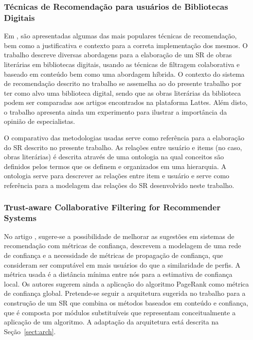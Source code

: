 \documentclass[12pt]{article}
\begin{document}
\subsubsection{Técnicas de Recomendação para usuários de Bibliotecas
Digitais}

Em \cite{primo2006tecnicas}, são apresentadas algumas das mais populares técnicas de recomendação, bem como a justificativa e contexto para a 
correta implementação dos mesmos. O trabalho descreve diversas abordagens para a elaboração de um SR de obras literárias 
em bibliotecas digitais, usando as técnicas de filtragem colaborativa e baseado em conteúdo bem como uma abordagem híbrida. 
O contexto do sistema de recomendação descrito no trabalho se assemelha ao do presente trabalho por ter como alvo uma 
biblioteca digital, sendo que as obras literárias da biblioteca podem ser comparadas aos artigos encontrados na plataforma 
Lattes. Além disto, o trabalho apresenta ainda um experimento para ilustrar a importância da opinião de especialistas.

O comparativo das metodologias usadas serve como referência para a elaboração do SR descrito no presente trabalho. 
As relações entre usuário e items (no caso, obras literárias) é descrita através de uma ontologia na qual conceitos são 
definidos pelos termos que os definem e organizados em uma hierarquia. A ontologia serve para descrever as relações entre 
item e usuário e serve como referência para a modelagem das relações do SR desenvolvido neste trabalho.

\subsubsection{Trust-aware Collaborative Filtering for Recommender Systems}

No artigo \cite{massa2004trust}, sugere-se a possibilidade de melhorar as sugestões em sistemas de recomendação com métricas de confiança, descrevem a modelagem de uma rede de confiança e a necessidade de métricas de propagação de confiança, que consideram ser computável em 
mais usuários do que a similaridade de perfis. A métrica usada é a distância mínima entre nós para a estimativa de 
confiança local. Os autores sugerem ainda a aplicação do algoritmo PageRank \cite{page1999pagerank} como métrica de confiança global. Pretende-se seguir a arquitetura sugerida no trabalho para a construção de um SR que combina os métodos baseados em conteúdo e confiança, que é composta por módulos substituíveis que representam conceitualmente a aplicação de um algoritmo. A adaptação da arquitetura está descrita na Seção~\ref{sect:arch}.
\end{document}
